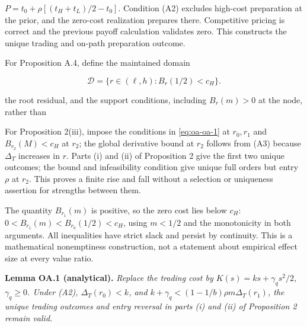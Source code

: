 \(P=t_0+\rho[(t_H+t_L)/2-t_0]\). Condition (A2) excludes high-cost
preparation at the prior, and the zero-cost realization prepares there.
Competitive pricing is correct and the previous payoff calculation
validates zero. This constructs the unique trading and on-path
preparation outcome.

For Proposition A.4, define the maintained domain

\[
\mathcal D=\{r\in(\ell,h):B_r(1/2)<c_H\}.
\tag{OA.19}\label{eq:oa-oa-19}
\]

the root residual, and the support conditions, including \(B_r(m)>0\) at the node, rather than

For Proposition 2(iii), impose the conditions in \eqref{eq:oa-oa-1} at \(r_0,r_1\) and \(B_{r_2}(M)<c_H\) at \(r_2\); the global derivative bound at \(r_2\) follows from (A3) because \(\Delta_T\) increases in \(r\). Parts (i) and (ii) of Proposition 2 give the first
two unique outcomes; the bound and infeasibility condition give unique
full orders but entry \(\rho\) at \(r_2\). This proves a finite rise and
fall without a selection or uniqueness assertion for strengths between
them.

The quantity \(B_{r_1}(m)\) is positive, so the zero cost lies below
\(c_H\): \(0<B_{r_1}(m)<B_{r_0}(1/2)<c_H\), using \(m<1/2\) and the monotonicity in
both arguments. All inequalities have strict slack and persist by
continuity. This is a mathematical nonemptiness construction, not a
statement about empirical effect size at every value ratio.

\protect{}\label{result-lemma-oa-1}{\textbf{Lemma OA.1
(analytical).}} \emph{Replace the trading cost by
\(K(s)=ks+\gamma_qs^2/2\), \(\gamma_q\ge0\). Under (A2),
\(\Delta_T(r_0)<k\), and \(k+\gamma_q<(1-1/b)\rho m\Delta_T(r_1)\), the
unique trading outcomes and entry reversal in parts (i) and (ii) of
Proposition 2 remain valid.}

